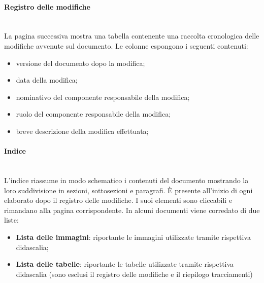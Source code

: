             \paragraph{Registro delle modifiche}\mbox{}\\ [1mm]
                La pagina successiva mostra una tabella contenente una raccolta cronologica delle modifiche avvenute sul documento.
                Le colonne espongono i seguenti contenuti:
                \begin{itemize}
                    \item versione del documento dopo la modifica;
                    \item data della modifica;
                    \item nominativo del componente responsabile della modifica;
                    \item ruolo del componente responsabile della modifica;
                    \item breve descrizione della modifica effettuata;
                \end{itemize}
            \paragraph{Indice}\mbox{}\\ [1mm]
                L'indice riassume in modo schematico i contenuti del documento mostrando la loro suddivisione in sezioni, sottosezioni e paragrafi.
                È presente all'inizio di ogni elaborato dopo il registro delle modifiche. I suoi elementi sono cliccabili e rimandano alla pagina
                corrispondente. In alcuni documenti viene corredato di due liste:
                \begin{itemize}
                    \item \textbf{Lista delle immagini}: riportante le immagini utilizzate tramite rispettiva didascalia;
                    \item \textbf{Lista delle tabelle}: riportante le tabelle utilizzate tramite rispettiva didascalia (sono esclusi il registro delle modifiche
                                                        e il riepilogo tracciamenti)
                \end{itemize}
